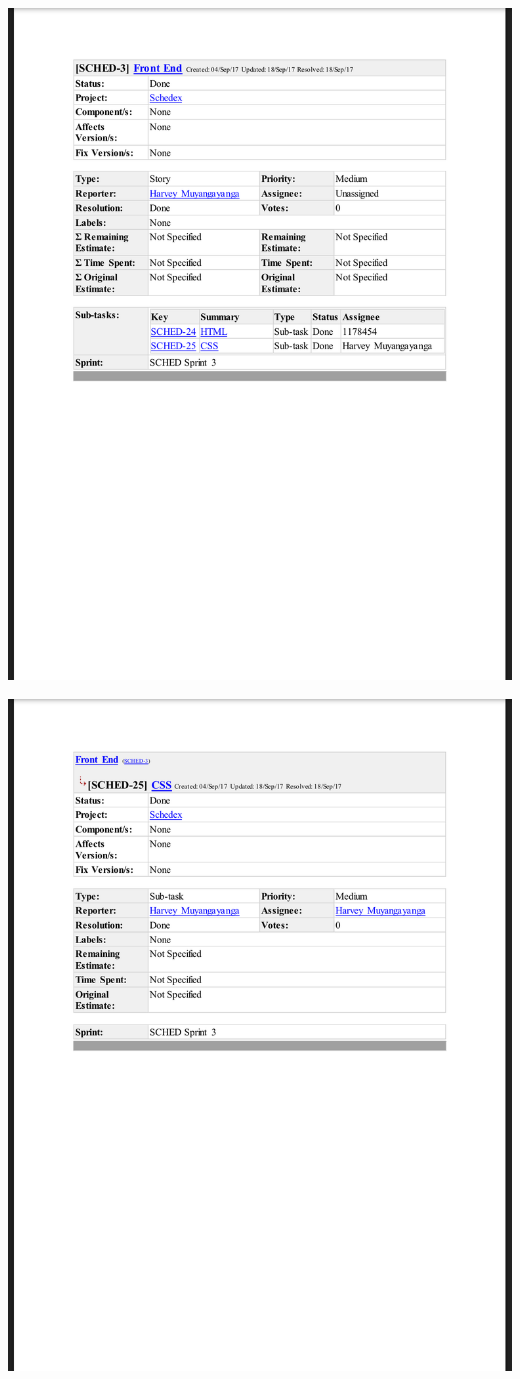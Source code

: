 \documentclass{article}
\begin{document}
\centerline{\includegraphics[scale=0.4]{sprint3_2}}

\centerline{\includegraphics[scale=0.4]{sprint3_3}}
\end{document}
